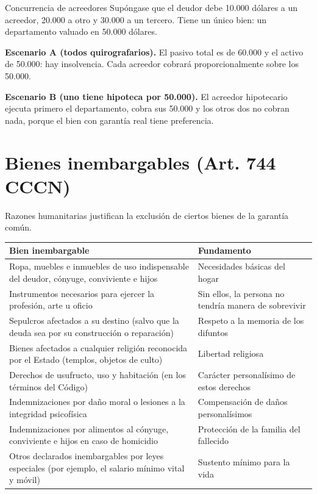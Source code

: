 \documentclass[12pt,oneside]{book}
\newenvironment{tabla}{%
    \par\medskip\begingroup\small\renewcommand{\arraystretch}{1.3}\noindent\ignorespaces
}{%
    \par\endgroup\medskip
}
\begin{document}
\begin{example}{Concurrencia de acreedores}
Supóngase que el deudor debe 10.000 dólares a un acreedor, 20.000 a otro y 30.000 a un tercero. Tiene un único bien: un departamento valuado en 50.000 dólares.

\textbf{Escenario A (todos quirografarios).} El pasivo total es de 60.000 y el activo de 50.000: hay insolvencia. Cada acreedor cobrará proporcionalmente sobre los 50.000.

\textbf{Escenario B (uno tiene hipoteca por 50.000).} El acreedor hipotecario ejecuta primero el departamento, cobra sus 50.000 y los otros dos no cobran nada, porque el bien con garantía real tiene preferencia.
\end{example}

\section{Bienes inembargables (Art. 744 CCCN)}

Razones humanitarias justifican la exclusión de ciertos bienes de la garantía común.

\begin{tabla}
\begin{tabularx}{\textwidth}{P{8.4cm}Y}
\toprule
\textbf{Bien inembargable} & \textbf{Fundamento} \\
\midrule
Ropa, muebles e inmuebles de uso indispensable del deudor, cónyuge, conviviente e hijos & Necesidades básicas del hogar \\
Instrumentos necesarios para ejercer la profesión, arte u oficio & Sin ellos, la persona no tendría manera de sobrevivir \\
Sepulcros afectados a su destino (salvo que la deuda sea por su construcción o reparación) & Respeto a la memoria de los difuntos \\
Bienes afectados a cualquier religión reconocida por el Estado (templos, objetos de culto) & Libertad religiosa \\
Derechos de usufructo, uso y habitación (en los términos del Código) & Carácter personalísimo de estos derechos \\
Indemnizaciones por daño moral o lesiones a la integridad psicofísica & Compensación de daños personalísimos \\
Indemnizaciones por alimentos al cónyuge, conviviente e hijos en caso de homicidio & Protección de la familia del fallecido \\
Otros declarados inembargables por leyes especiales (por ejemplo, el salario mínimo vital y móvil) & Sustento mínimo para la vida \\
\bottomrule
\end{tabularx}
\end{tabla}
\end{document}
